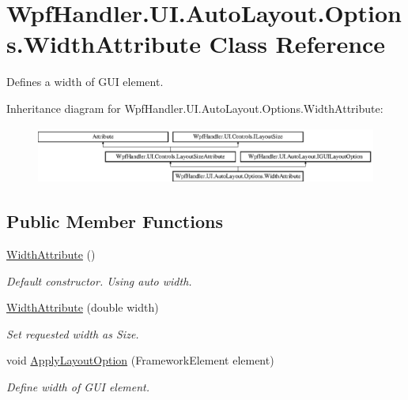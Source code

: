 \hypertarget{class_wpf_handler_1_1_u_i_1_1_auto_layout_1_1_options_1_1_width_attribute}{}\section{Wpf\+Handler.\+U\+I.\+Auto\+Layout.\+Options.\+Width\+Attribute Class Reference}
\label{class_wpf_handler_1_1_u_i_1_1_auto_layout_1_1_options_1_1_width_attribute}


Defines a width of G\+UI element.  


Inheritance diagram for Wpf\+Handler.\+U\+I.\+Auto\+Layout.\+Options.\+Width\+Attribute\+:\begin{figure}[H]
\begin{center}
\leavevmode
\includegraphics[height=1.872910cm]{d6/d44/class_wpf_handler_1_1_u_i_1_1_auto_layout_1_1_options_1_1_width_attribute}
\end{center}
\end{figure}
\subsection*{Public Member Functions}
\begin{DoxyCompactItemize}
\item 
\mbox{\hyperlink{class_wpf_handler_1_1_u_i_1_1_auto_layout_1_1_options_1_1_width_attribute_a6f7d00386300a62fc4abfbc98ea64dac}{Width\+Attribute}} ()
\begin{DoxyCompactList}\small\item\em Default constructor. Using auto width. \end{DoxyCompactList}\item 
\mbox{\hyperlink{class_wpf_handler_1_1_u_i_1_1_auto_layout_1_1_options_1_1_width_attribute_ad003db268061c52fdb4330dd9b57cda8}{Width\+Attribute}} (double width)
\begin{DoxyCompactList}\small\item\em Set requested width as Size. \end{DoxyCompactList}\item 
void \mbox{\hyperlink{class_wpf_handler_1_1_u_i_1_1_auto_layout_1_1_options_1_1_width_attribute_afdff5891e40ae82fc6282d78753ff644}{Apply\+Layout\+Option}} (Framework\+Element element)
\begin{DoxyCompactList}\small\item\em Define width of G\+UI element. \end{DoxyCompactList}\end{DoxyCompactItemize}
